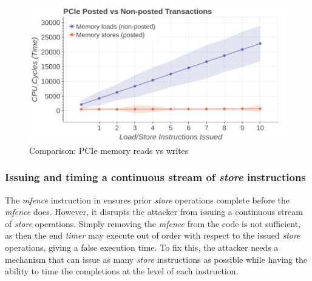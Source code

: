 \begin{figure}[!htb]
    \centering
    \includegraphics[width=\columnwidth]{figures/interconnect-sc/store-ops/pcie_mem_reads_v_writes.png}
    \caption{Comparison: PCIe memory reads vs writes}
    \label{fig:pcie-mem-reads-v-writes}
\end{figure}

\begin{minipage}{\textwidth}
    
    \captionsetup{type=lstlisting}
    \caption{Profiling the execution time of \textit{load/store} instruction.
    Each \textit{load} or \textit{store} instruction is issued on a unique memory address over 64 bytes from the previous address.}
    \label{lst:pcie-mem-reads-v-writes}
\end{minipage}

\subsubsection{Issuing and timing a continuous stream of \textit{store} instructions}
\label{subsubsec:interconnect-sc-store-ops-challenges-measuring-time}

The \textit{mfence} instruction in  ensures prior \textit{store} operations complete before the \textit{mfence} does.
However, it disrupts the attacker from issuing a continuous stream of \textit{store} operations.
Simply removing the \textit{mfence} from the code is not sufficient, as then the end \textit{timer} may execute out of order with respect to the issued \textit{store} operations, giving a false execution time.
To fix this, the attacker needs a mechanism that can issue as many \textit{store} instructions as possible while having the ability to time the completions at the level of each instruction.

